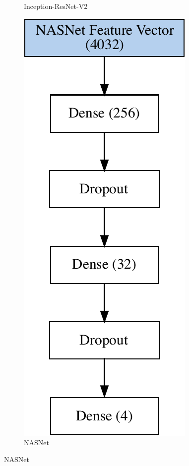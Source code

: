\begin{figure}[h!]
\begin{subfigure}[b]{0.3\linewidth}
    \caption{Inception-ResNet-V2} 
    \label{image-classification-model:inception} 
    \vspace{2ex}
  \end{subfigure}%
  \begin{subfigure}[b]{0.3\linewidth}
    \centering
    \includegraphics[scale=0.6]{graphics/image-classification-results/model/nasnet.pdf} 
    \caption{NASNet} 
    \label{image-classification-model:nasnet} 
    \vspace{2ex}
  \end{subfigure} 
  \centering
\end{figure}

